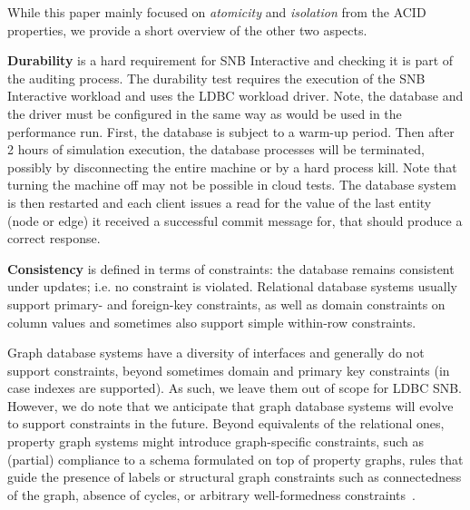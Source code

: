 While this paper mainly focused on \emph{atomicity} and \emph{isolation} from the ACID properties, we provide a short overview of the other two aspects.

{\bf Durability} is a hard requirement for SNB Interactive and checking it is part of the 
auditing process. 
The durability test requires the execution of the SNB Interactive workload and uses the LDBC workload driver.
Note, the database and the driver must be configured in the same way as would be used in the performance run.
First, the database is subject to a warm-up period.
Then after 2 hours of simulation execution, the database processes will be terminated, possibly by disconnecting the entire machine or by a hard process kill.
Note that turning the machine off may not be possible in cloud tests.
The database system is then restarted and each client issues a read for the value of the last entity (node or edge) it received a successful commit message for, that should produce a correct response.


{\bf Consistency} is defined in terms of constraints: the database remains 
consistent under updates; i.e. no constraint is violated.
Relational database systems usually support primary- and foreign-key 
constraints, as well as domain constraints on column values and 
sometimes also support simple within-row constraints.

Graph database systems have a diversity of interfaces and generally do not
support constraints, beyond sometimes domain and primary key constraints 
(in case indexes are supported).
As such, we leave them out of scope for LDBC SNB. 
However, we do note that we anticipate that graph database 
systems will evolve to support constraints in the future. 
Beyond equivalents of the relational ones, property graph systems 
might introduce graph-specific constraints, such as (partial) compliance to
a schema formulated on top of property graphs, rules that guide the 
presence of labels or structural graph constraints such as
connectedness of the graph, absence of cycles, %
or arbitrary well-formedness constraints~\cite{DBLP:journals/sosym/SemerathBHSV17}.
